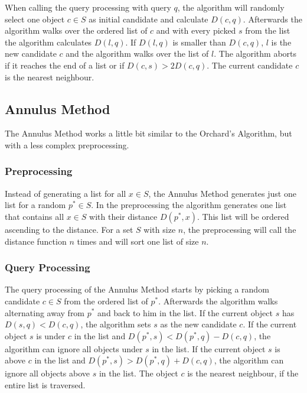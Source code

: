 \documentclass[runningheads,a4paper]{llncs}
\begin{document}
When calling the query processing with query $q$, the algorithm will randomly select one object $c \in S$ as initial
candidate and calculate $D(c, q)$. Afterwards the algorithm walks over the ordered list of $c$ and with every picked $s$
from the list the algorithm calculates $D(l, q)$. If $D(l, q)$ is smaller than $D(c, q)$, $l$ is the new candidate $c$
and the algorithm walks over the list of $l$. The algorithm aborts if it reaches the end of a list or if
$D(c, s) > 2D(c, q)$. The current candidate $c$ is the nearest neighbour.

\subsection{Annulus Method}

The Annulus Method works a little bit similar to the Orchard’s Algorithm, but with a less complex preprocessing.

\subsubsection{Preprocessing}

Instead of generating a list for all $x \in S$, the Annulus Method generates just one list for a random $p^* \in S$. In
the preprocessing the algorithm generates one list that contains all $x \in S$ with their distance $D(p^*, x)$. This
list will be ordered ascending to the distance. For a set $S$ with size $n$, the preprocessing will call the distance
function $n$ times and will sort one list of size $n$.

\subsubsection{Query Processing}

The query processing of the Annulus Method starts by picking a random candidate $c \in S$ from the ordered list of
$p^*$. Afterwards the algorithm walks alternating away from $p^*$ and back to him in the list. If the current object $s$
has $D(s, q) < D(c, q)$, the algorithm sets $s$ as the new candidate $c$. If the current object $s$ is under $c$ in the
list and $D(p^*, s) < D(p^*, q) - D(c, q)$, the algorithm can ignore all objects under $s$ in the list. If the current
object $s$ is above $c$ in the list and $D(p^*, s) > D(p^*, q) + D(c, q)$, the algorithm can ignore all objects above
$s$ in the list. The object $c$ is the nearest neighbour, if the entire list is traversed.
\end{document}
